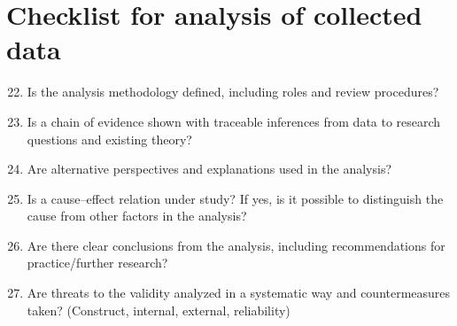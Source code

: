 \section{Checklist for analysis of collected data}
\begin{tcolorbox}[colback=black!5!white,colframe=black!75!white,title=Checklist for Preparation for data collection \cite{runeson2009guidelines}]
\begin{enumerate}
    \setcounter{enumi}{21}
    \item Is the analysis methodology defined, including roles and review procedures?
    \item Is a chain of evidence shown with traceable inferences from data to research
    questions and existing theory?
    \item Are alternative perspectives and explanations used in the analysis?
    \item Is a cause–effect relation under study? If yes, is it possible to distinguish the
    cause from other factors in the analysis?
    \item Are there clear conclusions from the analysis, including recommendations for
    practice/further research?
    \item Are threats to the validity analyzed in a systematic way and countermeasures
    taken? (Construct, internal, external, reliability)
\end{enumerate}
\end{tcolorbox}

